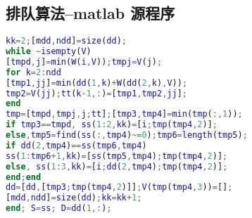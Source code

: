 \documentclass[withoutpreface,bwprint]{cumcmthesis} %
\begin{document}
\begin{appendices}
\section{排队算法--matlab 源程序}

\begin{lstlisting}[language=matlab]
kk=2;[mdd,ndd]=size(dd);
while ~isempty(V)
[tmpd,j]=min(W(i,V));tmpj=V(j);
for k=2:ndd
[tmp1,jj]=min(dd(1,k)+W(dd(2,k),V));
tmp2=V(jj);tt(k-1,:)=[tmp1,tmp2,jj];
end
tmp=[tmpd,tmpj,j;tt];[tmp3,tmp4]=min(tmp(:,1));
if tmp3==tmpd, ss(1:2,kk)=[i;tmp(tmp4,2)];
else,tmp5=find(ss(:,tmp4)~=0);tmp6=length(tmp5);
if dd(2,tmp4)==ss(tmp6,tmp4)
ss(1:tmp6+1,kk)=[ss(tmp5,tmp4);tmp(tmp4,2)];
else, ss(1:3,kk)=[i;dd(2,tmp4);tmp(tmp4,2)];
end;end
dd=[dd,[tmp3;tmp(tmp4,2)]];V(tmp(tmp4,3))=[];
[mdd,ndd]=size(dd);kk=kk+1;
end; S=ss; D=dd(1,:);
 \end{lstlisting}

\end{appendices}
\end{document}
